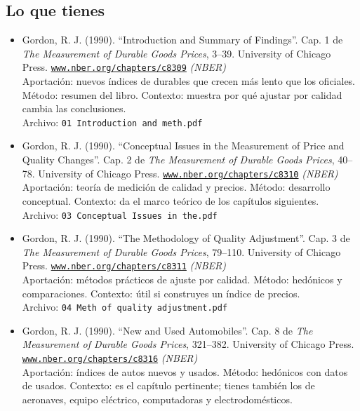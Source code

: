 \documentclass[11pt]{article}
\begin{document}
\subsection*{Lo que tienes}
\begin{itemize}
\item Gordon, R. J. (1990). ``Introduction and Summary of Findings''. Cap. 1 de \textit{The Measurement of Durable Goods Prices}, 3--39. University of Chicago Press. \href{http://www.nber.org/chapters/c8309}{\texttt{www.nber.org/chapters/c8309}} \textit{(NBER)}\\
Aportación: nuevos índices de durables que crecen más lento que los oficiales. Método: resumen del libro. Contexto: muestra por qué ajustar por calidad cambia las conclusiones.\\
{\footnotesize Archivo: \texttt{01 Introduction and meth.pdf}}
\item Gordon, R. J. (1990). ``Conceptual Issues in the Measurement of Price and Quality Changes''. Cap. 2 de \textit{The Measurement of Durable Goods Prices}, 40--78. University of Chicago Press. \href{http://www.nber.org/chapters/c8310}{\texttt{www.nber.org/chapters/c8310}} \textit{(NBER)}\\
Aportación: teoría de medición de calidad y precios. Método: desarrollo conceptual. Contexto: da el marco teórico de los capítulos siguientes.\\
{\footnotesize Archivo: \texttt{03 Conceptual Issues in the.pdf}}
\item Gordon, R. J. (1990). ``The Methodology of Quality Adjustment''. Cap. 3 de \textit{The Measurement of Durable Goods Prices}, 79--110. University of Chicago Press. \href{http://www.nber.org/chapters/c8311}{\texttt{www.nber.org/chapters/c8311}} \textit{(NBER)}\\
Aportación: métodos prácticos de ajuste por calidad. Método: hedónicos y comparaciones. Contexto: útil si construyes un índice de precios.\\
{\footnotesize Archivo: \texttt{04 Meth of quality adjustment.pdf}}
\item Gordon, R. J. (1990). ``New and Used Automobiles''. Cap. 8 de \textit{The Measurement of Durable Goods Prices}, 321--382. University of Chicago Press. \href{http://www.nber.org/chapters/c8316}{\texttt{www.nber.org/chapters/c8316}} \textit{(NBER)}\\
Aportación: índices de autos nuevos y usados. Método: hedónicos con datos de usados. Contexto: es el capítulo pertinente; tienes también los de aeronaves, equipo eléctrico, computadoras y electrodomésticos.\\

\end{itemize}
\end{document}
